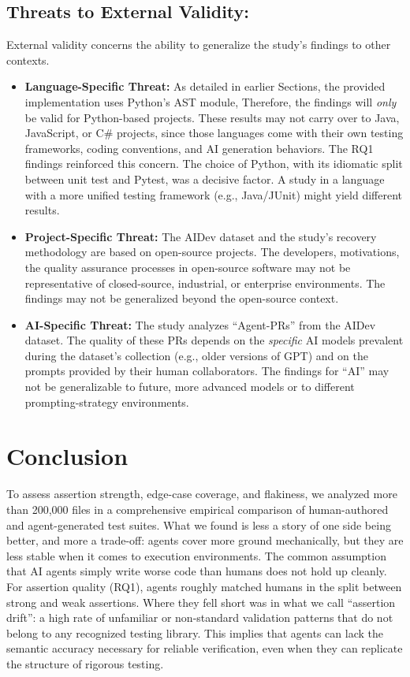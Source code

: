 \documentclass[conference]{IEEEtran}
\begin{document}
\subsection{Threats to External Validity:}
External validity concerns the ability to generalize the study's findings to other contexts.
\begin{itemize}
    \item \textbf{Language-Specific Threat:} As detailed in earlier Sections, the provided implementation uses Python's AST module, Therefore, the findings will \textit{only} be valid for Python-based projects. These results may not carry over to Java, JavaScript, or C\# projects, since those languages come with their own testing frameworks, coding conventions, and AI generation behaviors. The RQ1 findings reinforced this concern. The choice of Python, with its idiomatic split between unit test and Pytest, was a decisive factor. A study in a language with a more unified testing framework (e.g., Java/JUnit) might yield different results.
    \item \textbf{Project-Specific Threat:} The AIDev dataset and the study's recovery methodology are based on open-source projects. The developers, motivations, the quality assurance processes in open-source software may not be representative of closed-source, industrial, or enterprise environments. The findings may not be generalized beyond the open-source context.
    \item \textbf{AI-Specific Threat:} The study analyzes ``Agent-PRs'' from the AIDev dataset. The quality of these PRs depends on the \textit{specific} AI models prevalent during the dataset's collection (e.g., older versions of GPT) and on the prompts provided by their human collaborators. The findings for ``AI'' may not be generalizable to future, more advanced models or to different prompting-strategy environments.
\end{itemize}
\section{Conclusion}
\label{Section:Conclusion}
To assess assertion strength, edge-case coverage, and flakiness, we analyzed more than 200,000 files in a comprehensive empirical comparison of human-authored and agent-generated test suites. What we found is less a story of one side being better, and more a trade-off: agents cover more ground mechanically, but they are less stable when it comes to execution environments. The common assumption that AI agents simply write worse code than humans does not hold up cleanly.
For assertion quality (RQ1), agents roughly matched humans in the split between strong and weak assertions. Where they fell short was in what we call ``assertion drift'': a high rate of unfamiliar or non-standard validation patterns that do not belong to any recognized testing library. This implies that agents can lack the semantic accuracy necessary for reliable verification, even when they can replicate the structure of rigorous testing.
\end{document}
